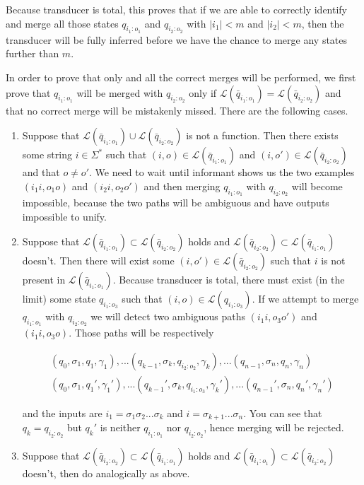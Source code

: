 Because transducer is total, this proves that if we are able to correctly identify and merge all those states $q_{i_1:o_1}$ and $q_{i_2:o_2}$ with $\vert i_1 \vert < m$ and $\vert i_2 \vert < m$, then the transducer will be fully inferred before we have the chance to merge any states further than $m$.

In order to prove that only and all the correct merges will be performed, we first prove that $q_{i_1:o_1}$ will be merged with $q_{i_2:o_2}$ only if $\mathcal{L}(\bar{q}_{i_1:o_1})=\mathcal{L}(\bar{q}_{i_2:o_2})$ and that no correct merge will be mistakenly missed. There are the following cases.

\begin{enumerate}
	\item Suppose that $\mathcal{L}(\bar{q}_{i_1:o_1}) \cup \mathcal{L}(\bar{q}_{i_2:o_2})$ is not a function.
	Then there exists some string $i\in\Sigma^*$ such that $(i,o) \in \mathcal{L}(\bar{q}_{i_1:o_1})$ and $(i,o') \in \mathcal{L}(\bar{q}_{i_2:o_2})$ and that $o\ne o'$. We need to wait until informant shows us the two examples $(i_1 i, o_1 o)$  and $(i_2 i, o_2 o')$ and then merging $q_{i_1:o_1}$ with $q_{i_2:o_2}$ will become impossible, because the two paths will be ambiguous and have outputs impossible to unify. 
	
	\item Suppose that $\mathcal{L}(\bar{q}_{i_1:o_1}) \subset \mathcal{L}(\bar{q}_{i_2:o_2})$ holds and $\mathcal{L}(\bar{q}_{i_2:o_2}) \subset \mathcal{L}(\bar{q}_{i_1:o_1})$ doesn't. Then there will exist some $(i,o')\in \mathcal{L}(\bar{q}_{i_2:o_2})$ such that 
	$i$ is not present in $\mathcal{L}(\bar{q}_{i_1:o_1})$.	
	Because transducer is total, there must exist (in the limit) some state $q_{i_1:o_3}$ such that $(i,o)\in \mathcal{L}(q_{i_1:o_3})$. If we attempt to merge   $q_{i_1:o_1}$ with $q_{i_2:o_2}$ we will detect two ambiguous paths $(i_1 i, o_3 o')$ and $(i_1 i , o_3 o)$. Those paths will be respectively 

	\begin{equation*}
	\begin{split}
	(q_0,\sigma_1,q_1,\gamma_1),...
	(q_{k-1},\sigma_k,q_{i_2:o_2},\gamma_k),...
	(q_{n-1},\sigma_n,q_n,\gamma_n) \\
	(q_0,\sigma_1,q_1',\gamma_1'),... (q_{k-1}',\sigma_k,q_{i_1:o_3},\gamma_k'),... (q_{n-1}',\sigma_n,q_n',\gamma_n')
	\end{split}
	\end{equation*}

	and the inputs are $i_1=\sigma_1\sigma_2...\sigma_k$ and $i=\sigma_{k+1}...\sigma_n$. You can see that $q_k=q_{i_2:o_2}$ but $q_k'$ is neither $q_{i_1:o_1}$ nor $q_{i_2:o_2}$, hence merging will be rejected.
	
	\item Suppose that $\mathcal{L}(\bar{q}_{i_2:o_2}) \subset \mathcal{L}(\bar{q}_{i_1:o_1})$ holds and  $\mathcal{L}(\bar{q}_{i_1:o_1}) \subset \mathcal{L}(\bar{q}_{i_2:o_2})$ doesn't, then do analogically as above.
\end{enumerate}

